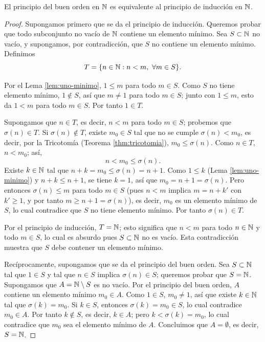 \documentclass[12pt,a4paper]{book}
\begin{document}
    \begin{teorema}
        \label{thm:equivalencia-buen-orden-pi}
        El principio del buen orden en $\mathbb{N}$ es equivalente al principio de inducción en $\mathbb{N}$.
    \end{teorema}
    \begin{proof}
        Supongamos primero que se da el principio de inducción. Queremos probar que todo subconjunto no vacío de $\mathbb{N}$ contiene un elemento mínimo. Sea $S\subset\mathbb{N}$ no vacío, y supongamos, por contradicción, que $S$ no contiene un elemento mínimo. Definimos
        \begin{equation*}
            T = \{n\in\mathbb{N} : n<m,\ \forall m\in S\}.
        \end{equation*}

        Por el Lema \ref{lem:uno-minimo}, $1\le m$ para todo $m\in S$. Como $S$ no tiene elemento mínimo, $1\notin S$, así que $m\neq1$ para todo $m\in S$; junto con $1\le m$, esto da $1<m$ para todo $m\in S$. Por tanto $1\in T$.

        Supongamos que $n\in T$, es decir, $n<m$ para todo $m\in S$; probemos que $\sigma(n)\in T$. Si $\sigma(n)\notin T$, existe $m_0\in S$ tal que no se cumple $\sigma(n)<m_0$, es decir, por la Tricotomía (Teorema \ref{thm:tricotomia}), $m_0\le\sigma(n)$. Como $n\in T$, $n<m_0$; así,
        \begin{equation*}
            n<m_0\le\sigma(n).
        \end{equation*}
        Existe $k\in\mathbb{N}$ tal que $n+k=m_0\le\sigma(n)=n+1$. Como $1\le k$ (Lema \ref{lem:uno-minimo}) y $n+k\le n+1$, se tiene $k=1$, así que $m_0=n+1=\sigma(n)$. Pero entonces $\sigma(n)\le m$ para todo $m\in S$ (pues $n<m$ implica $m=n+k'$ con $k'\ge1$, y por tanto $m\ge n+1=\sigma(n)$), es decir, $m_0$ es un elemento mínimo de $S$, lo cual contradice que $S$ no tiene elemento mínimo. Por tanto $\sigma(n)\in T$.

        Por el principio de inducción, $T=\mathbb{N}$; esto significa que $n<m$ para todo $n\in\mathbb{N}$ y todo $m\in S$, lo cual es absurdo pues $S\subset\mathbb{N}$ no es vacío. Esta contradicción muestra que $S$ debe contener un elemento mínimo.

        Recíprocamente, supongamos que se da el principio del buen orden. Sea $S\subset\mathbb{N}$ tal que $1\in S$ y tal que $n\in S$ implica $\sigma(n)\in S$; queremos probar que $S=\mathbb{N}$. Supongamos que $A=\mathbb{N}\setminus S$ es no vacío. Por el principio del buen orden, $A$ contiene un elemento mínimo $m_0\in A$. Como $1\in S$, $m_0\neq1$, así que existe $k\in\mathbb{N}$ tal que $\sigma(k)=m_0$. Si $k\in S$, entonces $\sigma(k)=m_0\in S$, lo cual contradice $m_0\in A$. Por tanto $k\notin S$, es decir, $k\in A$; pero $k<\sigma(k)=m_0$, lo cual contradice que $m_0$ sea el elemento mínimo de $A$. Concluimos que $A=\emptyset$, es decir, $S=\mathbb{N}$.
    \end{proof}
\end{document}
